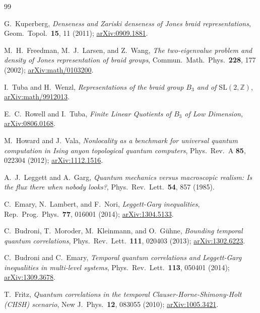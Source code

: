 \documentclass[aps,prx,reprint,amsmath,amssymb,floatfix,nofootinbib,superscriptaddress]{revtex4-2}
\begin{document}
\begin{thebibliography}{99}

G.~Kuperberg,
\emph{Denseness and Zariski denseness of Jones braid representations},
Geom.\ Topol.\ \textbf{15}, 11 (2011);
\href{https://arxiv.org/abs/0909.1881}{arXiv:0909.1881}.

M.~H.~Freedman, M.~J.~Larsen, and Z.~Wang,
\emph{The two-eigenvalue problem and density of Jones representation of braid groups},
Commun.\ Math.\ Phys.\ \textbf{228}, 177 (2002);
\href{https://arxiv.org/abs/math/0103200}{arXiv:math/0103200}.

I.~Tuba and H.~Wenzl,
\emph{Representations of the braid group $B_3$ and of $\mathrm{SL}(2,\mathbb{Z})$},
\href{https://arxiv.org/abs/math/9912013}{arXiv:math/9912013}.

E.~C.~Rowell and I.~Tuba,
\emph{Finite Linear Quotients of $B_3$ of Low Dimension},
\href{https://arxiv.org/abs/0806.0168}{arXiv:0806.0168}.

M.~Howard and J.~Vala,
\emph{Nonlocality as a benchmark for universal quantum computation in Ising anyon topological quantum computers},
Phys.\ Rev.\ A \textbf{85}, 022304 (2012);
\href{https://arxiv.org/abs/1112.1516}{arXiv:1112.1516}.

A.~J.~Leggett and A.~Garg,
\emph{Quantum mechanics versus macroscopic realism: Is the flux there when nobody looks?},
Phys.\ Rev.\ Lett.\ \textbf{54}, 857 (1985).

C.~Emary, N.~Lambert, and F.~Nori,
\emph{Leggett-Garg inequalities},
Rep.\ Prog.\ Phys.\ \textbf{77}, 016001 (2014);
\href{https://arxiv.org/abs/1304.5133}{arXiv:1304.5133}.

C.~Budroni, T.~Moroder, M.~Kleinmann, and O.~G\"uhne,
\emph{Bounding temporal quantum correlations},
Phys.\ Rev.\ Lett.\ \textbf{111}, 020403 (2013);
\href{https://arxiv.org/abs/1302.6223}{arXiv:1302.6223}.

C.~Budroni and C.~Emary,
\emph{Temporal quantum correlations and Leggett-Garg inequalities in multi-level systems},
Phys.\ Rev.\ Lett.\ \textbf{113}, 050401 (2014);
\href{https://arxiv.org/abs/1309.3678}{arXiv:1309.3678}.

T.~Fritz,
\emph{Quantum correlations in the temporal Clauser-Horne-Shimony-Holt (CHSH) scenario},
New J.\ Phys.\ \textbf{12}, 083055 (2010);
\href{https://arxiv.org/abs/1005.3421}{arXiv:1005.3421}.


\end{thebibliography}
\end{document}
